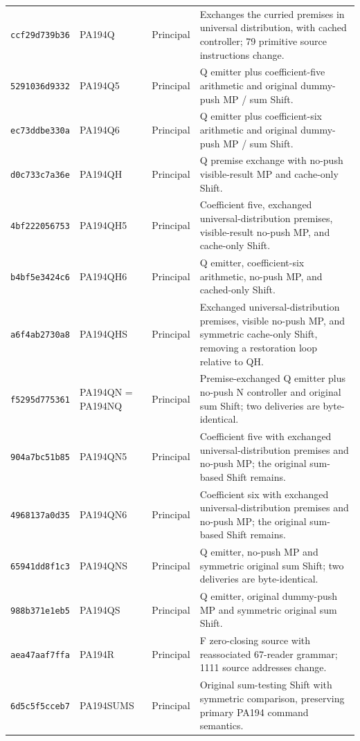 {\begin{longtable}{@{}>{\raggedright\arraybackslash}p{}>{\raggedright\arraybackslash}p{}>{\raggedright\arraybackslash}p{}>{\raggedright\arraybackslash}p{}@{}}
\texttt{ccf29d739b36} & PA194Q & Principal & Exchanges the curried premises in universal distribution, with cached controller; 79 primitive source instructions change.\\[3pt]
\texttt{5291036d9332} & PA194Q5 & Principal & Q emitter plus coefficient-five arithmetic and original dummy-push MP / sum Shift.\\[3pt]
\texttt{ec73ddbe330a} & PA194Q6 & Principal & Q emitter plus coefficient-six arithmetic and original dummy-push MP / sum Shift.\\[3pt]
\texttt{d0c733c7a36e} & PA194QH & Principal & Q premise exchange with no-push visible-result MP and cache-only Shift.\\[3pt]
\texttt{4bf222056753} & PA194QH5 & Principal & Coefficient five, exchanged universal-distribution premises, visible-result no-push MP, and cache-only Shift.\\[3pt]
\texttt{b4bf5e3424c6} & PA194QH6 & Principal & Q emitter, coefficient-six arithmetic, no-push MP, and cached-only Shift.\\[3pt]
\texttt{a6f4ab2730a8} & PA194QHS & Principal & Exchanged universal-distribution premises, visible no-push MP, and symmetric cache-only Shift, removing a restoration loop relative to QH.\\[3pt]
\texttt{f5295d775361} & PA194QN = PA194NQ & Principal & Premise-exchanged Q emitter plus no-push N controller and original sum Shift; two deliveries are byte-identical.\\[3pt]
\texttt{904a7bc51b85} & PA194QN5 & Principal & Coefficient five with exchanged universal-distribution premises and no-push MP; the original sum-based Shift remains.\\[3pt]
\texttt{4968137a0d35} & PA194QN6 & Principal & Coefficient six with exchanged universal-distribution premises and no-push MP; the original sum-based Shift remains.\\[3pt]
\texttt{65941dd8f1c3} & PA194QNS & Principal & Q emitter, no-push MP and symmetric original sum Shift; two deliveries are byte-identical.\\[3pt]
\texttt{988b371e1eb5} & PA194QS & Principal & Q emitter, original dummy-push MP and symmetric original sum Shift.\\[3pt]
\texttt{aea47aaf7ffa} & PA194R & Principal & F zero-closing source with reassociated 67-reader grammar; 1111 source addresses change.\\[3pt]
\texttt{6d5c5f5cceb7} & PA194SUMS & Principal & Original sum-testing Shift with symmetric comparison, preserving primary PA194 command semantics.\\[3pt]

\end{longtable}}
